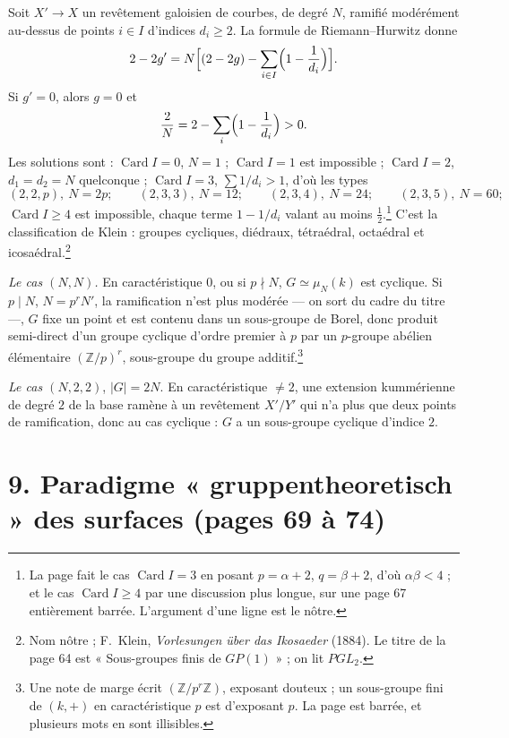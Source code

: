 \documentclass[11pt,a4paper]{article}
\begin{document}
Soit $X' \to X$ un revêtement galoisien de courbes, de degré $N$, ramifié
modérément au-dessus de points $i \in I$ d'indices $d_{i} \geqslant 2$. La formule
de Riemann--Hurwitz donne
\[
2 - 2g' = N \Bigl[(2 - 2g) - \sum_{i \in I} \Bigl(1 - \frac{1}{d_{i}}\Bigr)\Bigr] .
\]
Si $g' = 0$, alors $g = 0$ et
\[
\frac{2}{N} = 2 - \sum_{i} \Bigl(1 - \frac{1}{d_{i}}\Bigr) > 0 .
\]
Les solutions sont : $\operatorname{Card} I = 0$, $N = 1$ ; $\operatorname{Card}
I = 1$ est impossible ; $\operatorname{Card} I = 2$, $d_{1} = d_{2} = N$
quelconque ; $\operatorname{Card} I = 3$, $\sum 1/d_{i} > 1$, d'où les types
\[
(2, 2, p),\ N = 2p ; \qquad (2, 3, 3),\ N = 12 ; \qquad (2, 3, 4),\ N = 24 ; \qquad
(2, 3, 5),\ N = 60 ;
\]
$\operatorname{Card} I \geqslant 4$ est impossible, chaque terme $1 - 1/d_{i}$
valant au moins $\tfrac12$.\footnote{La page fait le cas $\operatorname{Card} I =
3$ en posant $p = \alpha + 2$, $q = \beta + 2$, d'où $\alpha\beta < 4$ ; et le cas
$\operatorname{Card} I \geqslant 4$ par une discussion plus longue, sur une page
67 entièrement barrée. L'argument d'une ligne est le nôtre.} C'est la
classification de Klein : groupes cycliques, diédraux, tétraédral, octaédral
et icosaédral.\footnote{Nom nôtre ; F.~Klein, \emph{Vorlesungen über das
Ikosaeder} (1884). Le titre de la page 64 est « Sous-groupes finis de
$GP(1)$ » ; on lit $PGL_{2}$.}

\emph{Le cas $(N, N)$.} En caractéristique $0$, ou si $p \nmid N$, $G \simeq
\mu_{N}(k)$ est cyclique. Si $p \mid N$, $N = p^{r}N'$, la ramification n'est
plus modérée --- on sort du cadre du titre ---, $G$ fixe un point et est contenu
dans un sous-groupe de Borel, donc produit semi-direct d'un groupe cyclique
d'ordre premier à $p$ par un $p$-groupe abélien élémentaire $(\mathbb{Z}/p)^{r}$,
sous-groupe du groupe additif.\footnote{Une note de marge écrit
$(\mathbb{Z}/p^{r}\mathbb{Z})$, exposant douteux ; un sous-groupe fini de $(k,
+)$ en caractéristique $p$ est d'exposant $p$. La page est barrée, et plusieurs
mots en sont illisibles.}

\emph{Le cas $(N, 2, 2)$}, $|G| = 2N$. En caractéristique $\neq 2$, une extension
kummérienne de degré $2$ de la base ramène à un revêtement $X'/Y'$ qui n'a plus
que deux points de ramification, donc au cas cyclique : $G$ a un sous-groupe
cyclique d'indice $2$.

\section*{9. Paradigme « gruppentheoretisch » des surfaces (pages 69 à 74)}
\end{document}
